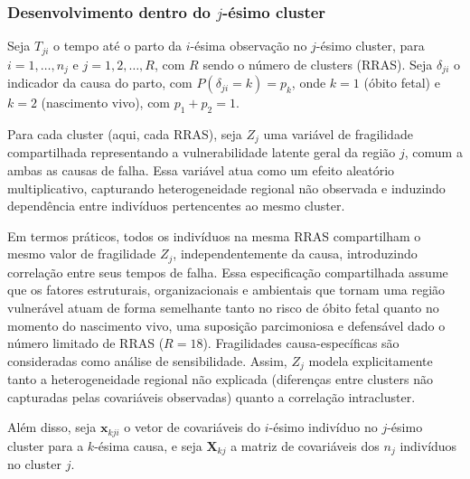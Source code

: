 \subsubsection*{Desenvolvimento dentro do $j$-ésimo cluster}

Seja $T_{ji}$ o tempo até o parto da $i$-ésima observação no $j$-ésimo cluster,
para $i=1,\ldots,n_j$ e $j=1,2,\ldots,R$, com $R$ sendo o número de clusters
(RRAS). Seja $\delta_{ji}$ o indicador da causa do parto, com
$P(\delta_{ji}=k)=p_k$, onde $k=1$ (óbito fetal) e $k=2$ (nascimento vivo),
com $p_1+p_2=1$.

Para cada cluster (aqui, cada RRAS), seja $Z_j$ uma variável de fragilidade
compartilhada representando a vulnerabilidade latente geral da região $j$,
comum a ambas as causas de falha. Essa variável atua como um efeito aleatório
multiplicativo, capturando heterogeneidade regional não observada e induzindo
dependência entre indivíduos pertencentes ao mesmo cluster.

Em termos práticos, todos os indivíduos na mesma RRAS compartilham o mesmo valor
de fragilidade $Z_j$, independentemente da causa, introduzindo correlação entre
seus tempos de falha. Essa especificação compartilhada assume que os fatores
estruturais, organizacionais e ambientais que tornam uma região vulnerável atuam
de forma semelhante tanto no risco de óbito fetal quanto no momento do nascimento
vivo, uma suposição parcimoniosa e defensável dado o número limitado de RRAS
($R=18$). Fragilidades causa-específicas são consideradas como análise de
sensibilidade. Assim, $Z_j$ modela explicitamente tanto a heterogeneidade regional
não explicada (diferenças entre clusters não capturadas pelas covariáveis
observadas) quanto a correlação intracluster.

Além disso, seja $\mathbf{x}_{kji}$ o vetor de covariáveis do $i$-ésimo indivíduo no
$j$-ésimo cluster para a $k$-ésima causa, e seja $\mathbf{X}_{kj}$ a matriz de covariáveis
dos $n_j$ indivíduos no cluster $j$.

